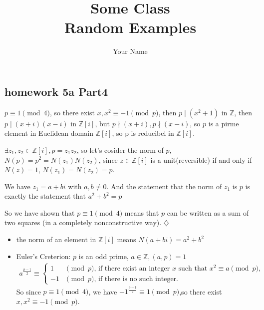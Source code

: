 \documentclass{report}
\title{\Huge{Some Class}\\Random Examples}
\author{\huge{Your Name}}
\date{}
\begin{document}
\maketitle
\newpage%
\tableofcontents
\pagebreak

\chapter{}
\section{homework 5a Part4}


\sol
{

$p\equiv 1 \pmod 4$, so there exist $x, x^2 \equiv -1 \pmod p$, then $p \mid (x^2+1)$ in $\mathbb{Z}$, then $p \mid (x+i)(x-i)$ in $\mathbb{Z}[i]$, but $p \nmid (x+i), p \nmid (x-i)$, so $p$ is a pirme element in Euclidean domain $\mathbb{Z}[i]$, so p is reducibel in $\mathbb{Z}[i]$.

$\exists z_1,z_2 \in \mathbb{Z}[i], p=z_1z_2$, so let's cosider the norm of $p$, $N(p)=p^2=N(z_1)N(z_2)$, since $z\in \mathbb{Z}[i]$ is a unit(reversible) if and only if $N(z)=1$, $N(z_1)=N(z_2)=p$.

We have $z_1=a+bi$ with $a,b \neq 0$. And the statement that the norm of $z_1$ is $p$ is exactly the statement that $a^2+b^2=p$

So we have shown that $p \equiv 1 \pmod 4$ means that $p$ can be written as a sum of two squares (in a completely nonconstructive way). $\diamondsuit$

\begin{note}
    \begin{itemize}
        \item the norm of an element in $\mathbb{Z}[i]$ means $N(a+bi)=a^2+b^2$
        \item Euler's Creterion: $p$ is an odd prime, $a\in \mathbb{Z},(a,p)=1$\begin{align*}
                  a^{\frac{p-1}{2}} \equiv \begin{cases}1 &\pmod p \text{, if there exist an integer $x$ such that $x^2 \equiv a \pmod p$,}\\ -1 &\pmod p  \text{, if there is no such integer.} \end{cases}
              \end{align*}So since $p \equiv 1 \pmod 4$, we have $-1^{\frac{p-1}{2}}\equiv 1 \pmod p$,so there exist $x, x^2 \equiv -1 \pmod p$.
    \end{itemize}
\end{note}

}
\end{document}
